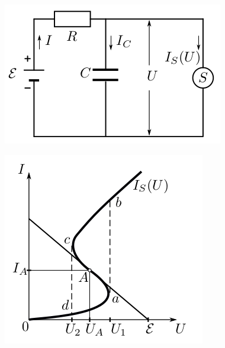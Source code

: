 \documentclass[14pt, a4paper,reqno]{article}
\begin{document}
    \begin{minipage}{0.49\linewidth}
        \includegraphics[width = \linewidth]{images/picture_1.png}
    \end{minipage}
    \hfill
    \begin{minipage}{0.49\linewidth}
        \includegraphics[width = \linewidth]{images/picture_2.png}
    \end{minipage}
\end{document}

